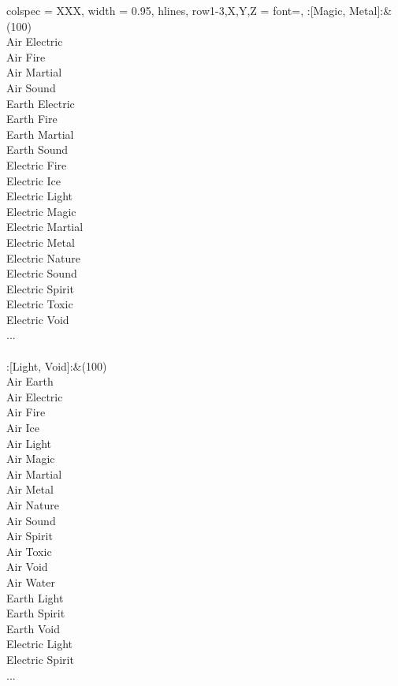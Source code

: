 \begin{longtblr}[
	caption = {2v2 Defending Weak},
	label = {2v2-Defending-Weak},
]{
	colspec = {XXX}, width = 0.95\linewidth,
	hlines,
	row{1-3,X,Y,Z} = {font=\bfseries},
}
	:[Magic, Metal]:&{(100)\\
	Air Electric \\
	Air Fire \\
	Air Martial \\
	Air Sound \\
	Earth Electric \\
	Earth Fire \\
	Earth Martial \\
	Earth Sound \\
	Electric Fire \\
	Electric Ice \\
	Electric Light \\
	Electric Magic \\
	Electric Martial \\
	Electric Metal \\
	Electric Nature \\
	Electric Sound \\
	Electric Spirit \\
	Electric Toxic \\
	Electric Void \\
	...\\
	}\\

	:[Light, Void]:&{(100)\\
	Air Earth \\
	Air Electric \\
	Air Fire \\
	Air Ice \\
	Air Light \\
	Air Magic \\
	Air Martial \\
	Air Metal \\
	Air Nature \\
	Air Sound \\
	Air Spirit \\
	Air Toxic \\
	Air Void \\
	Air Water \\
	Earth Light \\
	Earth Spirit \\
	Earth Void \\
	Electric Light \\
	Electric Spirit \\
	...\\
	}\\


\end{longtblr}
